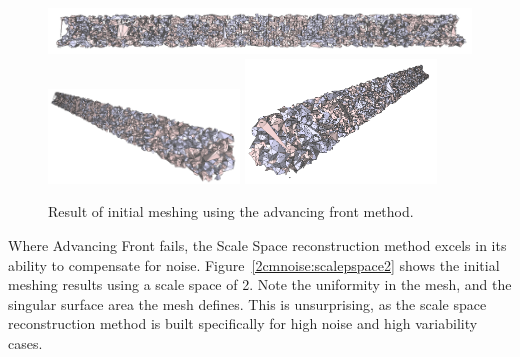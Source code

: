 \documentclass[12pt]{drexelthesis}
\begin{document}
\begin{figure}[!ht]
	\centering
		\includegraphics[width=5in]{simulated-lab-scan/2cmnoise/2cmmeshNeat/advancingfront00.png}
		\includegraphics[width=2in]{simulated-lab-scan/2cmnoise/2cmmeshNeat/advancingfront01.png}
		\includegraphics[width=2in]{simulated-lab-scan/2cmnoise/2cmmeshNeat/advancingfront02.png}
		\caption[Initial meshing using a raw advancing front approach]{\centering  Result of initial meshing using the advancing front method.}
		\label{2cmnoise:advancingfront}
\end{figure}

Where Advancing Front fails, the Scale Space reconstruction method excels in its ability to compensate for noise. Figure~\ref{2cmnoise:scalepspace2} shows the initial meshing results using a scale space of 2. Note the uniformity in the mesh, and the singular surface area the mesh defines. This is unsurprising, as the scale space reconstruction method is built specifically for high noise and high variability cases.
\end{document}
